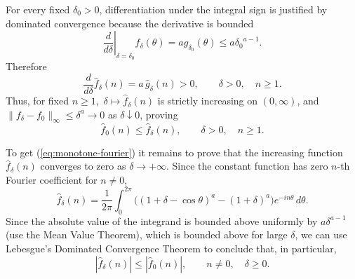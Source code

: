\documentclass[11pt]{amsart}
\begin{document}
For every fixed $\delta_0>0$, differentiation under the integral sign is
justified by dominated convergence
because the derivative is bounded
$$\left. \frac{d}{d\delta}\right|_{\delta=\delta_0}f_\delta(\theta)=ag_{\delta_0}(\theta)\le a{\delta_0}^{a-1}.$$
Therefore
\[
    \frac{d}{d\delta}\widehat f_\delta(n)
    =
    a\,\widehat g_\delta(n)>0,
    \qquad
    \delta>0,\quad n\geq1.
\]
Thus, for fixed $n\ge 1,$ $\delta\mapsto\widehat f_\delta(n)$ is strictly increasing on
$(0,\infty)$, and
$\|f_\delta-f_0\|_\infty\le\delta^a\to0$ as $\delta\downarrow0$, proving
\begin{equation*}%
    \widehat f_0(n)\leq\widehat f_\delta(n),
    \qquad
    \delta>0,\quad n\geq1.
\end{equation*}

To get (\ref{eq:monotone-fourier}) it remains to prove that the increasing function
$\widehat f_\delta(n)$ converges to zero as $\delta\to +\infty$.
Since the constant function has zero $n$-th Fourier coefficient for
$n\neq0$,
\[
    \widehat f_\delta(n)
    =     \frac{1}{2\pi}\int_0^{2\pi}
      \bigl((1+\delta-\cos\theta)^a-(1+\delta)^a\bigr)e^{-in\theta}\,d\theta.
\]
Since the absolute value of the integrand is bounded above uniformly by $a\delta^{a-1}$ (use the Mean Value Theorem), which is bounded above for large $\delta$, we can use Lebesgue's Dominated Convergence Theorem to conclude that, in particular,
\begin{equation}\label{eq:fourier-domination}
    |\widehat f_\delta(n)|
    \leq
    |\widehat f_0(n)|,
    \qquad n\neq0,\quad \delta\geq0.
\end{equation}
\end{document}
